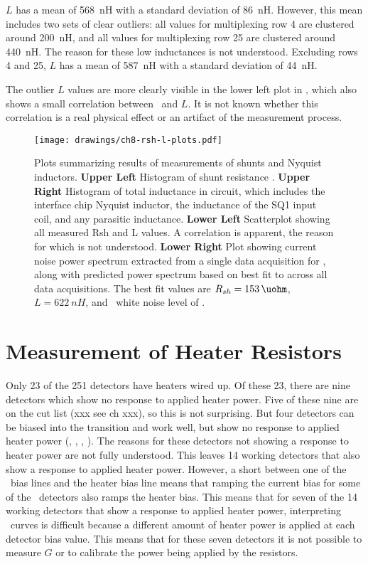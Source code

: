 $L$ has a mean of 568~nH with a standard deviation of 86~nH.
However, this mean includes two sets of clear outliers: all values for multiplexing row 4 are clustered around 200~nH, and all values for multiplexing row 25 are clustered around 440~nH.
The reason for these low inductances is not understood.
Excluding rows 4 and 25,  $L$ has a mean of 587~nH with a standard deviation of 44~nH.

The outlier $L$ values are more clearly visible in the lower left plot in , which also shows a small correlation between \Rsh\ and $L$.
It is not known whether this correlation is a real physical effect or an artifact of the measurement process.

\begin{figure*}
\texttt{[image: drawings/ch8-rsh-l-plots.pdf]}
\caption{Plots summarizing results of measurements of shunts and Nyquist inductors.
\textbf{Upper Left} Histogram of shunt resistance \Rsh.
\textbf{Upper Right} Histogram of total inductance in circuit, which includes the interface chip Nyquist inductor, the inductance of the SQ1 input coil, and any parasitic inductance.
\textbf{Lower Left} Scatterplot showing all measured Rsh and L values. A correlation is apparent, the reason for which is not understood.
\textbf{Lower Right} Plot showing current noise power spectrum extracted from a single data acquisition for , along with predicted power spectrum based on best fit to  across all data acquisitions. The best fit values are $\Rsh=\SI{153}{\uohm}$, $L = \SI{622}{nH}$, and \SQUID\ white noise level of .}
\label{fig:rsh-l-plots}
\end{figure*}

\section{Measurement of Heater Resistors} \label{sec:heater-r}

Only 23 of the 251 detectors have heaters wired up.
Of these 23, there are nine detectors which show no response to applied heater power.
Five of these nine are on the cut list (xxx see ch xxx), so this is not surprising.
But four detectors can be biased into the transition and work well, but show no response to applied heater power (, , , ).
The reasons for these detectors not showing a response to heater power are not fully understood.
This leaves 14 working detectors that also show a response to applied heater power.
However, a short between one of the \TES\ bias lines and the heater bias line means that ramping the current bias for some of the \TES\ detectors also ramps the heater bias.
This means that for seven of the 14 working detectors that show a response to applied heater power, interpreting \IV\ curves is difficult because a different amount of heater power is applied at each detector bias value.
This means that for these seven detectors it is not possible to measure $G$ or to calibrate the power being applied by the resistors.

